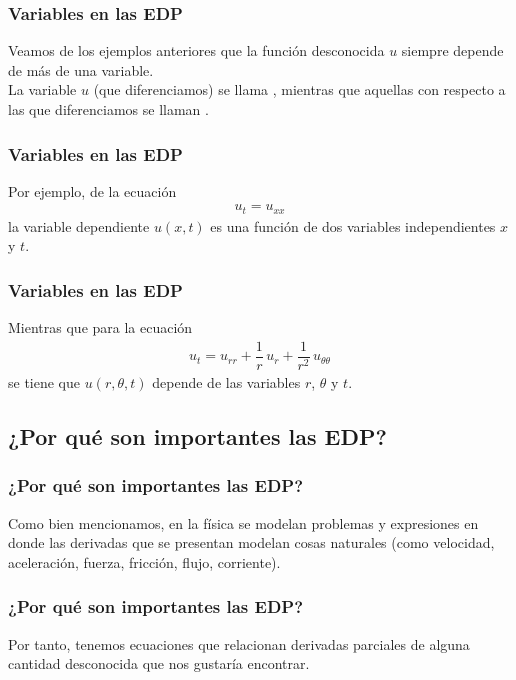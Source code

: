 \documentclass[12pt]{beamer}
\begin{document}
\begin{frame}
\frametitle{Variables en las EDP}
Veamos de los ejemplos anteriores que la función desconocida $u$ siempre depende de más de una variable.
\\
\bigskip
\pause
La variable $u$ (que diferenciamos) se llama , \pause mientras que aquellas con respecto a las que diferenciamos se llaman .
\end{frame}
\begin{frame}
\frametitle{Variables en las EDP}
Por ejemplo, de la ecuación
\begin{align*}
u_{t} = u_{xx}
\end{align*}
la variable dependiente $u(x, t)$ es una función de dos variables independientes $x$ y $t$.
\end{frame}
\begin{frame}
\frametitle{Variables en las EDP}
Mientras que para la ecuación
\begin{align*}
u_{t} = u_{rr} + \dfrac{1}{r} \, u_{r} + \dfrac{1}{r^{2}} \, u_{\theta \theta}
\end{align*}
se tiene que $u(r, \theta, t)$ depende de las variables $r$, $\theta$ y $t$.
\end{frame}

\subsection{¿Por qué son importantes las EDP?}

\begin{frame}
\frametitle{¿Por qué son importantes las EDP?}
Como bien mencionamos, en la física se modelan problemas y expresiones en donde las derivadas que se presentan modelan cosas naturales (como velocidad, aceleración, fuerza, fricción, flujo, corriente). 
\end{frame}
\begin{frame}
\frametitle{¿Por qué son importantes las EDP?}
Por tanto, tenemos ecuaciones que relacionan derivadas parciales de alguna cantidad desconocida que nos gustaría encontrar.
\end{frame}
\end{document}
